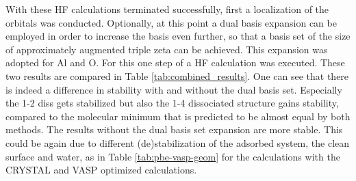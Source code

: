 \documentclass[11pt,DIV=13,BCOR=5mm,a4paper,headinclude]{scrbook}
\begin{document}
With these HF calculations terminated successfully, first a localization of the orbitals was conducted.
Optionally, at this point a dual basis expansion can be employed in order to increase the basis even further\cite{Usvyat2010}, so that a basis set of the size of approximately augmented triple zeta can be achieved.
This expansion was adopted for Al and O.
For this one step of a HF calculation was executed.
These two results are compared in Table \ref{tab:combined_results}. %
One can see that there is indeed a difference in stability with and without the dual basis set.
Especially the 1-2 diss gets stabilized but also the 1-4 dissociated structure gains stability, compared to the molecular minimum that is predicted to be almost equal by both methods.
The results without the dual basis set expansion are more stable.
This could be again due to different (de)stabilization of the adsorbed system, the clean surface and water, as in Table \ref{tab:pbe-vasp-geom} for the calculations with the CRYSTAL and VASP optimized calculations.
\end{document}
